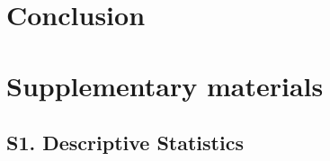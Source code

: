\documentclass[a4paper,12pt]{article}
\newcommand{\beginsupplement}{%
	\setcounter{table}{0}
	\renewcommand{\thetable}{S.\arabic{table}}%
	\setcounter{figure}{0}
	\renewcommand{\thefigure}{S.\arabic{figure}}%
}
\begin{document}
\section{Conclusion}






\beginsupplement

\section{Supplementary materials}

\subsection{S1. Descriptive Statistics}

	
\end{document}
